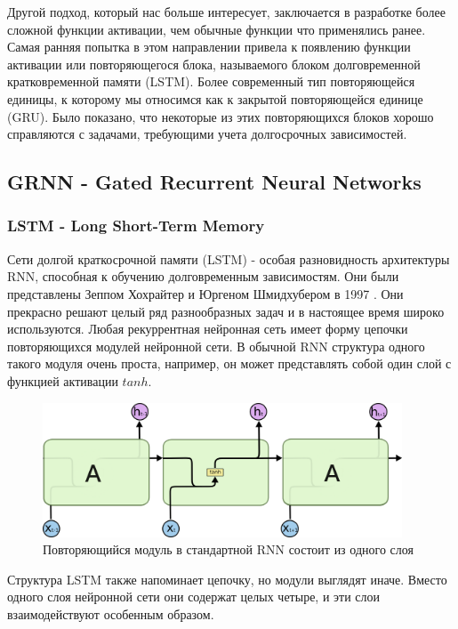 	Другой подход, который нас больше интересует, заключается в разработке более сложной функции активации, чем обычные функции что применялись ранее. Самая ранняя попытка в этом направлении привела к появлению функции активации или повторяющегося блока, называемого блоком долговременной кратковременной памяти (LSTM)\cite{2}. Более современный тип повторяющейся единицы, к которому мы относимся как к закрытой повторяющейся единице (GRU)\cite{3}. Было показано, что некоторые из этих повторяющихся блоков хорошо справляются с задачами, требующими учета долгосрочных зависимостей.
	
	\subsection{GRNN - Gated Recurrent Neural Networks}
	\subsubsection{LSTM - Long Short-Term Memory}
	
	Сети долгой краткосрочной памяти (LSTM) - особая разновидность архитектуры RNN, способная к обучению долговременным зависимостям. Они были представлены Зеппом Хохрайтер и Юргеном Шмидхубером в 1997 \cite{2}. Они прекрасно решают целый ряд разнообразных задач и в настоящее время широко используются. Любая рекуррентная нейронная сеть имеет форму цепочки повторяющихся модулей нейронной сети. В обычной RNN структура одного такого модуля очень проста, например, он может представлять собой один слой с функцией активации $tanh$. 
	
	\begin{figure}[ht!]
		\centering
		\captionsetup{justification=centering}
		\includegraphics[height=40mm]{img/RNN Chain.png}
		\caption{Повторяющийся модуль в стандартной RNN состоит из одного слоя}
	\end{figure}
	
	Структура LSTM также напоминает цепочку, но модули выглядят иначе. Вместо одного слоя нейронной сети они содержат целых четыре, и эти слои взаимодействуют особенным образом. 
	
